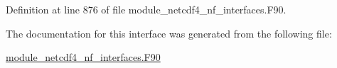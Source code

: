 Definition at line 876 of file module\+\_\+netcdf4\+\_\+nf\+\_\+interfaces.\+F90.



The documentation for this interface was generated from the following file\+:\begin{DoxyCompactItemize}
\item 
\hyperlink{module__netcdf4__nf__interfaces_8F90}{module\+\_\+netcdf4\+\_\+nf\+\_\+interfaces.\+F90}\end{DoxyCompactItemize}
